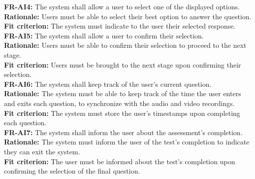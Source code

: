 \documentclass[12pt]{article}
\begin{document}
\textbf{FR-AI4: } The system shall allow a user to select one of the displayed options.\\
\textbf{Rationale: } Users must be able to select their best option to answer the question.\\
\textbf{Fit criterion: } The system must indicate to the user their selected response.\\

\textbf{FR-AI5: } The system shall allow a user to confirm their selection.\\
\textbf{Rationale: } Users must be able to confirm their selection to proceed to the next stage.\\
\textbf{Fit criterion: } Users must be brought to the next stage upon confirming their selection.\\

\textbf{FR-AI6: } The system shall keep track of the user's current question.\\
\textbf{Rationale: } The system must be able to keep track of the time the user enters and exits each question, to synchronize with the audio and video recordings.\\
\textbf{Fit criterion: } The system must store the user's timestamps upon completing each question.\\

\textbf{FR-AI7: } The system shall inform the user about the assessment's completion.\\
\textbf{Rationale: } The system must inform the user of the test's completion to indicate they can exit the system.\\
\textbf{Fit criterion: } The user must be informed about the test's completion upon confirming the selection of the final question.\\
\end{document}
